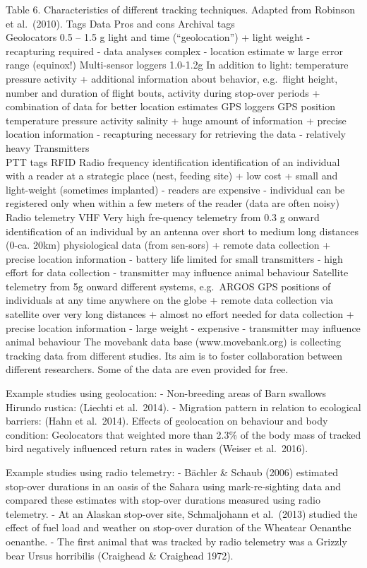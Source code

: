 \documentclass[
]{book}
\begin{document}
Table 6. Characteristics of different tracking techniques. Adapted from Robinson et al.~(2010).
Tags Data Pros and cons
Archival tags\\
Geolocators
0.5 -- 1.5 g light and time (``geolocation'')
+ light weight
- recapturing required
- data analyses complex
- location estimate w large error range (equinox!)
Multi-sensor loggers
1.0-1.2g
In addition to light:
temperature
pressure
activity
+ additional information about behavior, e.g.~flight height, number and duration of flight bouts, activity during stop-over periods
+ combination of data for better location estimates
GPS loggers GPS position
temperature
pressure
activity
salinity + huge amount of information
+ precise location information
- recapturing necessary for retrieving the data
- relatively heavy
Transmitters\\
PTT tags
RFID Radio frequency identification identification of an individual with a reader at a strategic place (nest, feeding site) + low cost
+ small and light-weight (sometimes implanted)
- readers are expensive
- individual can be registered only when within a few meters of the reader (data are often noisy)
Radio telemetry
VHF Very high fre-quency telemetry
from 0.3 g onward identification of an individual by an antenna over short to medium long distances (0-ca. 20km)
physiological data (from sen-sors) + remote data collection
+ precise location information
- battery life limited for small transmitters
- high effort for data collection
- transmitter may influence animal behaviour
Satellite telemetry
from 5g onward
different systems, e.g.~ARGOS
GPS positions of individuals at any time anywhere on the globe + remote data collection via satellite over very long distances
+ almost no effort needed for data collection
+ precise location information
- large weight
- expensive
- transmitter may influence animal behaviour
The movebank data base (www.movebank.org) is collecting tracking data from different studies. Its aim is to foster collaboration between different researchers. Some of the data are even provided for free.

Example studies using geolocation:
- Non-breeding areas of Barn swallows Hirundo rustica: (Liechti et al.~2014).
- Migration pattern in relation to ecological barriers: (Hahn et al.~2014).
Effects of geolocation on behaviour and body condition: Geolocators that weighted more than 2.3\% of the body mass of tracked bird negatively influenced return rates in waders (Weiser et al.~2016).

Example studies using radio telemetry:
- Bächler \& Schaub (2006) estimated stop-over durations in an oasis of the Sahara using mark-re-sighting data and compared these estimates with stop-over durations measured using radio telemetry.
- At an Alaskan stop-over site, Schmaljohann et al.~(2013) studied the effect of fuel load and weather on stop-over duration of the Wheatear Oenanthe oenanthe.
- The first animal that was tracked by radio telemetry was a Grizzly bear Ursus horribilis (Craighead \& Craighead 1972).
\end{document}
